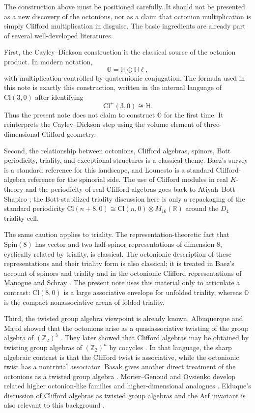 \documentclass[11pt]{article}
\newcommand{\Ztwo}{\mathbb Z_2}
\newcommand{\Cl}{\mathrm{Cl}}
\begin{document}
The construction above must be positioned carefully. It should not be presented
as a new discovery of the octonions, nor as a claim that octonion multiplication
is simply Clifford multiplication in disguise. The basic ingredients are already
part of several well-developed literatures.

First, the Cayley--Dickson construction is the classical source of the
 octonion product. In modern notation,
\[
\mathbb O=\mathbb H\oplus \mathbb H\ell,
\]
with multiplication controlled by quaternionic conjugation. The formula used in
this note is exactly this construction, written in the internal language of
$\Cl(3,0)$ after identifying
\[
\Cl^+(3,0)\cong \mathbb H.
\]
Thus the present note does not claim to construct $\mathbb O$ for the first
time. It reinterprets the Cayley--Dickson step using the volume element of
three-dimensional Clifford geometry.

Second, the relationship between octonions, Clifford algebras, spinors, Bott
periodicity, triality, and exceptional structures is a classical theme. Baez's
survey \cite{BaezOctonions} is a standard reference for this landscape, and
Lounesto \cite{Lounesto} is a standard Clifford-algebra reference for the
spinorial side. The use of Clifford modules in real $K$-theory and the
periodicity of real Clifford algebras goes back to Atiyah--Bott--Shapiro
\cite{AtiyahBottShapiro}; the Bott-stabilized triality discussion here is only
a repackaging of the standard periodicity
$\Cl(n+8,0)\cong\Cl(n,0)\otimes M_{16}(\mathbb R)$ around the $D_4$
triality cell.

The same caution applies to triality. The representation-theoretic fact that
$\mathrm{Spin}(8)$ has vector and two half-spinor representations of dimension
$8$, cyclically related by triality, is classical. The octonionic description of
these representations and their triality form is also classical; it is treated
in Baez's account of spinors and triality and in the octonionic Clifford
representations of Manogue and Schray \cite{BaezOctonions,ManogueSchray}. The
present note uses this material only to articulate a contrast: $\Cl(8,0)$ is a
large associative envelope for unfolded triality, whereas $\mathbb O$ is the
compact nonassociative arena of folded triality.

Third, the twisted group algebra viewpoint is already known. Albuquerque and
Majid showed that the octonions arise as a quasiassociative twisting of the
group algebra of $(\Ztwo)^3$ \cite{AlbuquerqueMajidOctonions}. They later
showed that Clifford algebras may be obtained by twisting group algebras of
$(\Ztwo)^n$ by cocycles \cite{AlbuquerqueMajidClifford}. In that language,
the sharp algebraic contrast is that the Clifford twist is associative, while
the octonionic twist has a nontrivial associator. Basak gives another direct
treatment of the octonions as a twisted group algebra \cite{BasakOctonions}.
Morier--Genoud and Ovsienko develop related higher octonion-like families and
higher-dimensional analogues \cite{MorierGenoudOvsienko}. Elduque's discussion
of Clifford algebras as twisted group algebras and the Arf invariant is also
relevant to this background \cite{ElduqueArf}.
\end{document}
